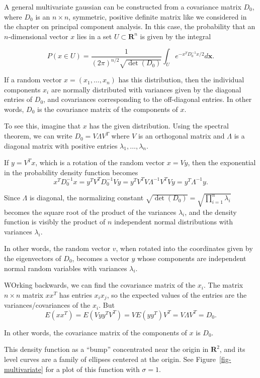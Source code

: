 \documentclass[
  11pt,
  letterpaper,
]{scrbook}
\theoremstyle{plain}
\theoremstyle{remark}
\begin{document}
A general multivariate gaussian can be constructed from a covariance
matrix \(D_{0}\), where \(D_{0}\) is an \(n\times n\), symmetric,
positive definite matrix like we considered in the chapter on principal
component analysis. In this case, the probability that an
\(n\)-dimensional vector \(x\) lies in a set \(U\subset \mathbf{R}^{n}\)
is given by the integral

\[
P(x\in U) = \frac{1}{(2\pi)^{n/2}\sqrt{\det(D_{0})}}\int_{U} e^{-x^{T}D_{0}^{-1}x/2} d\mathbf{x}.
\]

If a random vector \(x=(x_1,\ldots, x_n)\) has this distribution, then
the individual components \(x_{i}\) are normally distributed with
variances given by the diagonal entries of \(D_{0}\), and covariances
corresponding to the off-diagonal entries. In other words, \(D_{0}\) is
the covariance matrix of the components of \(x\).

To see this, imagine that \(x\) has the given distribution. Using the
spectral theorem, we can write \(D_{0}=V\Lambda V^{T}\) where \(V\) is
an orthogonal matrix and \(\Lambda\) is a diagonal matrix with positive
entries \(\lambda_{1},\ldots, \lambda_{n}\).

If \(y=V^{T}x\), which is a rotation of the random vector \(x=Vy\), then
the exponential in the probability density function becomes \[
x^{T}D_{0}^{-1}x = y^{T}V^{T}D_{0}^{-1}Vy = y^{T}V^{T}V\Lambda^{-1}V^{T}Vy = y^{T}\Lambda^{-1}y.
\]

Since \(\Lambda\) is diagonal, the normalizing constant
\(\sqrt{\det(D_{0})}=\sqrt{\prod_{i=1}^{n}\lambda_{i}}\) becomes the
square root of the product of the variances \(\lambda_{i}\), and the
density function is visibly the product of \(n\) independent normal
distributions with variances \(\lambda_{i}\).

In other words, the random vector \(v\), when rotated into the
coordinates given by the eigenvectors of \(D_{0}\), becomes a vector
\(y\) whose components are independent normal random variables with
variances \(\lambda_{i}\).

WOrking backwards, we can find the covariance matrix of the \(x_{i}\).
The matrix \(n\times n\) matrix \(xx^{T}\) has entries \(x_{i}x_{j}\),
so the expected values of the entries are the variances/covariances of
the \(x_{i}\). But \[
E(xx^{T})=E(Vyy^{T}V^{T}) = VE(yy^{T})V^{T} = V\Lambda V^{T}=D_{0}.
\]

In other words, the covariance matrix of the components of \(x\) is
\(D_{0}\).

This density function as a ``bump'' concentrated near the origin in
\(\mathbf{R}^{2}\), and its level curves are a family of ellipses
centered at the origin. See Figure~\ref{fig-multivariate} for a plot of
this function with \(\sigma=1\).
\end{document}
